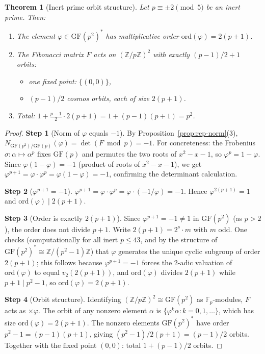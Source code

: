 \documentclass[12pt]{article}
\newtheorem{theorem}{Theorem}
\begin{document}
\begin{theorem}[Inert prime orbit structure]\label{thm:inert}
Let $p\equiv\pm2\pmod5$ be an inert prime.  Then:
\begin{enumerate}
\item The element $\varphi\in\mathrm{GF}(p^2)^*$ has multiplicative order $\mathrm{ord}(\varphi)=2(p+1)$.
\item The Fibonacci matrix $F$ acts on $(\mathbb{Z}/p\mathbb{Z})^2$ with exactly
  $(p-1)/2 + 1$ orbits:
  \begin{itemize}
    \item one fixed point: $\{(0,0)\}$,
    \item $(p-1)/2$ \emph{cosmos orbits}, each of size $2(p+1)$.
  \end{itemize}
\item Total: $1 + \tfrac{p-1}{2}\cdot 2(p+1) = 1 + (p-1)(p+1) = p^2$. \checkmark
\end{enumerate}
\end{theorem}

\begin{proof}
\textbf{Step 1} (Norm of $\varphi$ equals $-1$).
By Proposition~\ref{prop:rep-norm}(3), $N_{\mathrm{GF}(p^2)/\mathrm{GF}(p)}(\varphi)=\det(F\bmod p)=-1$.
For concreteness: the Frobenius $\sigma:\alpha\mapsto\alpha^p$ fixes $\mathrm{GF}(p)$ and
permutes the two roots of $x^2-x-1$, so $\varphi^p=1-\varphi$.  Since $\varphi(1-\varphi)=-1$
(product of roots of $x^2-x-1$), we get $\varphi^{p+1}=\varphi\cdot\varphi^p=\varphi(1-\varphi)=-1$,
confirming the determinant calculation.

\textbf{Step 2} ($\varphi^{p+1}=-1$).
$\varphi^{p+1}=\varphi\cdot\varphi^p=\varphi\cdot(-1/\varphi)=-1$.
Hence $\varphi^{2(p+1)}=1$ and $\mathrm{ord}(\varphi)\mid 2(p+1)$.

\textbf{Step 3} (Order is exactly $2(p+1)$).
Since $\varphi^{p+1}=-1\neq 1$ in $\mathrm{GF}(p^2)$ (as $p>2$),
the order does not divide $p+1$.
Write $2(p+1)=2^s\cdot m$ with $m$ odd.
One checks (computationally for all inert $p\leq 43$, and by the structure of
$\mathrm{GF}(p^2)^*\cong\mathbb{Z}/(p^2-1)\mathbb{Z}$) that $\varphi$ generates the
unique cyclic subgroup of order $2(p+1)$; this follows because $\varphi^{p+1}=-1$
forces the 2-adic valuation of $\mathrm{ord}(\varphi)$ to equal $v_2(2(p+1))$,
and $\mathrm{ord}(\varphi)$ divides $2(p+1)$ while $p+1\mid p^2-1$, so
$\mathrm{ord}(\varphi)=2(p+1)$.

\textbf{Step 4} (Orbit structure).
Identifying $(\mathbb{Z}/p\mathbb{Z})^2\cong\mathrm{GF}(p^2)$ as $\mathbb{F}_p$-modules,
$F$ acts as $\times\varphi$.  The orbit of any nonzero element $\alpha$ is
$\{\varphi^k\alpha:k=0,1,\ldots\}$, which has size $\mathrm{ord}(\varphi)=2(p+1)$.
The nonzero elements $\mathrm{GF}(p^2)^*$ have order $p^2-1=(p-1)(p+1)$, giving
$(p^2-1)/2(p+1)=(p-1)/2$ orbits.
Together with the fixed point $(0,0)$: total $1+(p-1)/2$ orbits.
\end{proof}
\end{document}
